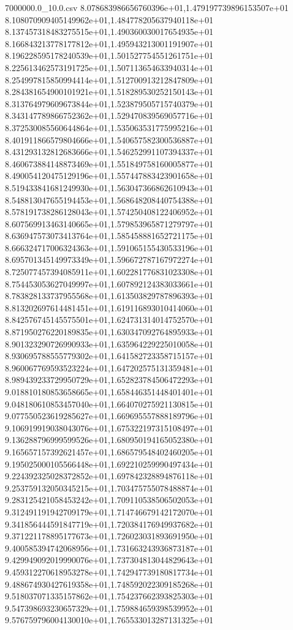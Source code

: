 \begin{filecontents*}{7000000.0_10.0.csv}
8.078683986656760396e+01,1.479197739896153507e+01
8.108070909405149962e+01,1.484778205637940118e+01
8.137457318483275515e+01,1.490360030017654935e+01
8.166843213778177812e+01,1.495943213001191907e+01
8.196228595178240539e+01,1.501527754551261751e+01
8.225613462573191725e+01,1.507113654633940314e+01
8.254997815850994414e+01,1.512700913212847809e+01
8.284381654900101921e+01,1.518289530252150143e+01
8.313764979609673844e+01,1.523879505715740379e+01
8.343147789866752362e+01,1.529470839569057716e+01
8.372530085560644864e+01,1.535063531775995216e+01
8.401911866579804666e+01,1.540657582300536887e+01
8.431293132812683666e+01,1.546252991107394337e+01
8.460673884148873469e+01,1.551849758160005877e+01
8.490054120475129196e+01,1.557447883423901658e+01
8.519433841681249930e+01,1.563047366862610943e+01
8.548813047655194453e+01,1.568648208440754388e+01
8.578191738286128043e+01,1.574250408122406952e+01
8.607569913463140665e+01,1.579853965871279797e+01
8.636947573073413764e+01,1.585458881652721175e+01
8.666324717006324363e+01,1.591065155430533196e+01
8.695701345149973349e+01,1.596672787167972274e+01
8.725077457394085911e+01,1.602281776831023308e+01
8.754453053627049997e+01,1.607892124383033661e+01
8.783828133737955568e+01,1.613503829787896393e+01
8.813202697614481451e+01,1.619116893010414060e+01
8.842576745145575501e+01,1.624731314014752570e+01
8.871950276220189835e+01,1.630347092764895933e+01
8.901323290726990933e+01,1.635964229225010058e+01
8.930695788555779302e+01,1.641582723358715157e+01
8.960067769593523224e+01,1.647202575131359481e+01
8.989439233729950729e+01,1.652823784506472293e+01
9.018810180853658665e+01,1.658446351448401401e+01
9.048180610853457040e+01,1.664070275921130815e+01
9.077550523619285627e+01,1.669695557888189796e+01
9.106919919038043076e+01,1.675322197315108497e+01
9.136288796999599526e+01,1.680950194165052380e+01
9.165657157392621457e+01,1.686579548402460205e+01
9.195025000105566448e+01,1.692210259990497434e+01
9.224392325028372852e+01,1.697842328894876118e+01
9.253759132050345215e+01,1.703475755078488874e+01
9.283125421058453242e+01,1.709110538506502053e+01
9.312491191942709179e+01,1.714746679142172070e+01
9.341856444591847719e+01,1.720384176949937682e+01
9.371221178895177673e+01,1.726023031893691950e+01
9.400585394742068956e+01,1.731663243936873187e+01
9.429949092019990076e+01,1.737304813044829643e+01
9.459312270618953278e+01,1.742947739180817734e+01
9.488674930427619358e+01,1.748592022309185268e+01
9.518037071335157862e+01,1.754237662393825303e+01
9.547398693230657329e+01,1.759884659398539952e+01
9.576759796004130010e+01,1.765533013287131325e+01

\end{filecontents*}
